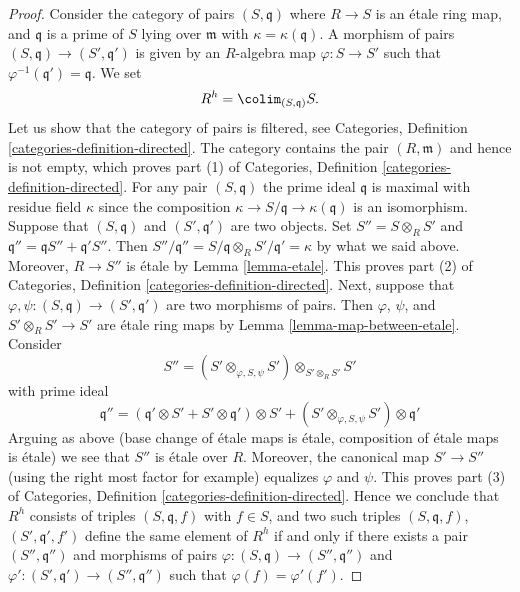 \begin{proof}
Consider the category of pairs $(S, \mathfrak q)$ where $R \to S$ is an
\'etale ring map, and $\mathfrak q$ is a prime of $S$ lying over
$\mathfrak m$ with $\kappa = \kappa(\mathfrak q)$. A morphism of pairs
$(S, \mathfrak q) \to (S', \mathfrak q')$ is given by an $R$-algebra
map $\varphi : S \to S'$ such that $\varphi^{-1}(\mathfrak q') = \mathfrak q$.
We set
$$
R^h = \colim_{(S, \mathfrak q)} S.
$$
Let us show that the category of pairs is filtered, see
Categories, Definition \ref{categories-definition-directed}.
The category contains the pair $(R, \mathfrak m)$ and hence is not empty,
which proves part (1) of
Categories, Definition \ref{categories-definition-directed}.
For any pair $(S, \mathfrak q)$ the prime ideal $\mathfrak q$
is maximal with residue field $\kappa$ since the composition
$\kappa \to S/\mathfrak q \to \kappa(\mathfrak q)$ is an isomorphism.
Suppose that $(S, \mathfrak q)$ and $(S', \mathfrak q')$ are two objects. Set
$S'' = S \otimes_R S'$ and $\mathfrak q'' = \mathfrak qS'' + \mathfrak q'S''$.
Then $S''/\mathfrak q'' = S/\mathfrak q \otimes_R S'/\mathfrak q' = \kappa$
by what we said above. Moreover, $R \to S''$ is \'etale by
Lemma \ref{lemma-etale}.
This proves part (2) of
Categories, Definition \ref{categories-definition-directed}.
Next, suppose that
$\varphi, \psi : (S, \mathfrak q) \to (S', \mathfrak q')$
are two morphisms of pairs. Then $\varphi$, $\psi$, and
$S' \otimes_R S' \to S'$ are \'etale ring maps by
Lemma \ref{lemma-map-between-etale}.
Consider
$$
S'' = (S' \otimes_{\varphi, S, \psi} S')
\otimes_{S' \otimes_R S'} S'
$$
with prime ideal
$$
\mathfrak q'' =
(\mathfrak q' \otimes S' + S' \otimes \mathfrak q') \otimes S'
+
(S' \otimes_{\varphi, S, \psi} S') \otimes \mathfrak q'
$$
Arguing as above (base change of \'etale maps is \'etale, composition of
\'etale maps is \'etale) we see that $S''$ is \'etale over $R$. Moreover,
the canonical map $S' \to S''$ (using the right most factor for example)
equalizes $\varphi$ and $\psi$. This proves part (3) of
Categories, Definition \ref{categories-definition-directed}.
Hence we conclude that $R^h$ consists of triples $(S, \mathfrak q, f)$
with $f \in S$, and two such triples
$(S, \mathfrak q, f)$, $(S', \mathfrak q', f')$
define the same element of $R^h$ if and only if there exists
a pair $(S'', \mathfrak q'')$ and morphisms of pairs
$\varphi : (S, \mathfrak q) \to (S'', \mathfrak q'')$
and
$\varphi' : (S', \mathfrak q') \to (S'', \mathfrak q'')$
such that $\varphi(f) = \varphi'(f')$.


\end{proof}
